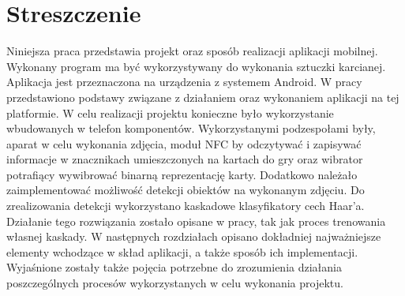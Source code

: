 \section*{Streszczenie}
Niniejsza praca przedstawia projekt oraz sposób realizacji aplikacji mobilnej. Wykonany program ma być wykorzystywany do wykonania sztuczki karcianej. Aplikacja jest przeznaczona na urządzenia z systemem Android. W pracy przedstawiono podstawy związane z działaniem oraz wykonaniem aplikacji na tej platformie. W celu realizacji projektu konieczne było wykorzystanie wbudowanych w telefon komponentów. Wykorzystanymi podzespołami były, aparat w celu wykonania zdjęcia, moduł NFC by odczytywać i zapisywać informacje w znacznikach umieszczonych na kartach do gry oraz wibrator potrafiący wywibrować binarną reprezentację karty. Dodatkowo należało zaimplementować możliwość detekcji obiektów na wykonanym zdjęciu. Do zrealizowania detekcji wykorzystano kaskadowe klasyfikatory cech Haar'a. Działanie tego rozwiązania zostało opisane w pracy, tak jak proces trenowania własnej kaskady. W następnych rozdziałach opisano dokładniej najważniejsze elementy wchodzące w skład aplikacji, a także sposób ich implementacji. Wyjaśnione zostały także pojęcia potrzebne do zrozumienia działania poszczególnych procesów wykorzystanych w celu wykonania projektu. 
